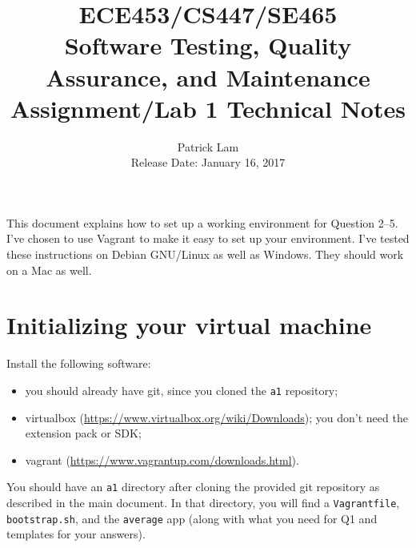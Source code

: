 \documentclass[10pt,hidelinks]{article}
\begin{document}
\title{
ECE453/CS447/SE465 \\
Software Testing, Quality Assurance, and Maintenance\\
Assignment/Lab 1 Technical Notes}
\author{Patrick Lam \\
{Release Date:  January 16, 2017} \\
}
\renewcommand{\today}{}
\maketitle


This document explains how to set up a working environment for
Question 2--5. I've chosen to use Vagrant to make it easy to set up your
environment. I've tested these instructions on Debian GNU/Linux as
well as Windows. They should work on a Mac as well.

\section*{Initializing your virtual machine}

Install the following software:
\begin{itemize}
\item you should already have git, since you cloned the {\tt a1}
  repository;
\item virtualbox (\url{https://www.virtualbox.org/wiki/Downloads}); you don't need the extension pack or SDK;
\item vagrant (\url{https://www.vagrantup.com/downloads.html}).
\end{itemize}


You should have an {\tt a1} directory after cloning the provided git
repository as described in the main document. In that directory,
you will find a {\tt Vagrantfile}, {\tt bootstrap.sh}, and the {\tt average} app
(along with what you need for Q1 and templates for your answers).
\end{document}

